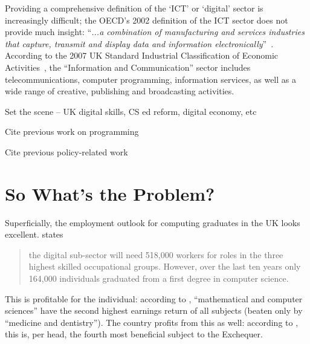 \documentclass[sigconf]{acmart}
\begin{document}
Providing a comprehensive definition of the `ICT' or `digital' sector
is increasingly difficult; the OECD's 2002 definition of the ICT
sector does not provide much insight: ``{\emph{...a combination of
manufacturing and services industries that capture, transmit and
display data and information
electronically}}''~\cite{oecd:2002}. According to the 2007 UK Standard
Industrial Classification of Economic Activities~\cite{onssic:2009},
the ``Information and Communication'' sector includes
telecommunications, computer programming, information services, as
well as a wide range of creative, publishing and broadcasting
activities.



Set the scene -- UK digital skills, CS ed reform, digital economy, etc

Cite previous work on
programming~\cite{davenport-et-al:latice2016,murphy-et-al:programming2017,simon-et-al:sigcse2018}

Cite previous policy-related
work~\cite{crick+sentance:2011,brown-et-al:sigcse2013,brown-et-al:toce2014,crick+moller:wipsce2015,moller+crick:jce2018}

\section{So What's the Problem?}

Superficially, the employment outlook for computing graduates in the
UK looks excellent. \cite[p.~74]{UKCES2015b} states
\begin{quote} the digital sub-sector will need 518,000 workers for
roles in the three highest skilled occupational groups. However, over
the last ten years only 164,000 individuals graduated from a first
degree in computer science.
\end{quote} This is profitable for the individual: according to
\cite[Figure 4]{BIS2011a}, ``mathematical and computer sciences'' have
the second highest earnings return of all subjects (beaten only by
``medicine and dentistry'').  The country profits from this as well:
according to \cite[p.~16]{BIS2011a}, this is, per head, the fourth
most beneficial subject to the Exchequer.

\end{document}

